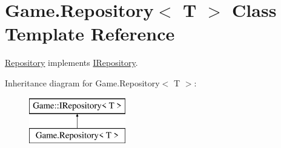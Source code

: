 \hypertarget{class_game_1_1_repository}{}\section{Game.\+Repository$<$ T $>$ Class Template Reference}
\label{class_game_1_1_repository}


\mbox{\hyperlink{class_game_1_1_repository}{Repository}} implements \mbox{\hyperlink{interface_game_1_1_i_repository}{I\+Repository}}.  


Inheritance diagram for Game.\+Repository$<$ T $>$\+:\begin{figure}[H]
\begin{center}
\leavevmode
\includegraphics[height=2.000000cm]{class_game_1_1_repository}
\end{center}
\end{figure}
